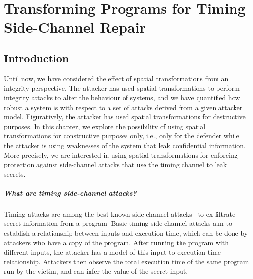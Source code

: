 \chapter{Transforming Programs for Timing Side-Channel Repair}
\label{ch:SideChannelRepair}
\section{Introduction}
\label{sec:introduction} 
Until now, we have considered the effect of spatial transformations from an integrity perspective. The attacker has used spatial transformations to perform integrity attacks to alter the behaviour of systems, and we have quantified how robust a system is with respect to a set of attacks derived from a given attacker model. 
Figuratively, the attacker has used spatial transformations for destructive purposes. 
In this chapter, we explore the possibility of using spatial transformations for constructive purposes only, i.e., only for the defender while the attacker is using weaknesses of the system that leak confidential information. 
More precisely, we are interested in using spatial transformations for enforcing protection against side-channel attacks that use the timing channel to leak secrets. 


\paragraph*{What are timing side-channel attacks?} Timing attacks are among the best known side-channel attacks~\cite{timing-channel-survey} 
to ex-filtrate secret information from a program. %
Basic timing side-channel attacks aim to establish a relationship between inputs and execution time, which can be done by attackers who have a copy of the program. After running the program with different inputs, the attacker has a model of this input to execution-time relationship. Attackers then observe the total execution time of the same program run by the victim, and can infer the value of the secret input. 

